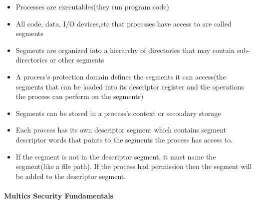 \documentclass[
  12pt]{findlay}
\providecommand{\tightlist}{%
  \setlength{\itemsep}{0pt}\setlength{\parskip}{0pt}}
\begin{document}
\begin{itemize}
\tightlist
\item
  Processes are executables(they run program code)
\item
  All code, data, I/O devices,etc that processes have access to are
  called segments
\item
  Segments are organized into a hierarchy of directories that may
  contain sub-directories or other segments
\item
  A process's protection domain defines the segments it can access(the
  segments that can be loaded into its descriptor register and the
  operations the process can perform on the segments)
\item
  Segments can be stored in a process's context or secondary storage
\item
  Each process has its own descriptor segment which contains segment
  descriptor words that points to the segments the process has access
  to.
\item
  If the segment is not in the descriptor segment, it must name the
  segment(like a file path). If the process had permission then the
  segment will be added to the descriptor segment.
\end{itemize}

\hypertarget{multics-security-fundamentals}{%
\paragraph{Multics Security
Fundamentals}\label{multics-security-fundamentals}}
\end{document}
